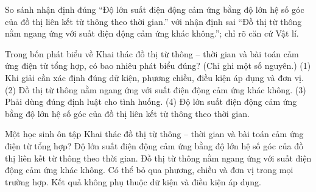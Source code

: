 \begin{bt}
So sánh nhận định đúng “Độ lớn suất điện động cảm ứng bằng độ lớn hệ số góc của đồ thị liên kết từ thông theo thời gian.” với nhận định sai “Đồ thị từ thông nằm ngang ứng với suất điện động cảm ứng khác không.”; chỉ rõ căn cứ Vật lí.
\end{bt}

\begin{ex}
Trong bốn phát biểu về Khai thác đồ thị từ thông – thời gian và bài toán cảm ứng điện từ tổng hợp, có bao nhiêu phát biểu đúng? (Chỉ ghi một số nguyên.) (1) Khi giải cần xác định đúng dữ kiện, phương chiều, điều kiện áp dụng và đơn vị. (2) Đồ thị từ thông nằm ngang ứng với suất điện động cảm ứng khác không. (3) Phải dùng đúng định luật cho tình huống. (4) Độ lớn suất điện động cảm ứng bằng độ lớn hệ số góc của đồ thị liên kết từ thông theo thời gian.
\end{ex}

\begin{ex}
Một học sinh ôn tập Khai thác đồ thị từ thông – thời gian và bài toán cảm ứng điện từ tổng hợp?
\choice
{\True Độ lớn suất điện động cảm ứng bằng độ lớn hệ số góc của đồ thị liên kết từ thông theo thời gian.}
{Đồ thị từ thông nằm ngang ứng với suất điện động cảm ứng khác không.}
{Có thể bỏ qua phương, chiều và đơn vị trong mọi trường hợp.}
{Kết quả không phụ thuộc dữ kiện và điều kiện áp dụng.}
\end{ex}

